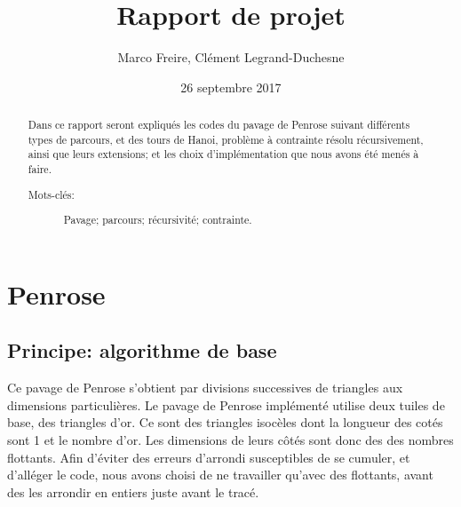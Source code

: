 \documentclass[a4paper, 11pt]{article}%
\begin{document}
\title{Rapport de projet}

\author{Marco Freire, Clément Legrand-Duchesne}

\date{26 septembre 2017}

\maketitle

\begin{abstract}
  Dans ce rapport seront expliqués les codes du pavage de Penrose
  suivant différents types de parcours, et des tours de Hanoi, problème
  à contrainte résolu récursivement, ainsi que leurs extensions; et les
  choix d'implémentation que nous avons été menés à faire.
  \begin{description}
    
  \item[Mots-clés:] Pavage; parcours; récursivité; contrainte.

   

  \end{description}
\end{abstract}


\section{Penrose}
        \subsection{Principe: algorithme de base}
                Ce pavage de Penrose s'obtient par divisions
                successives de triangles aux dimensions particulières. 
                Le pavage de Penrose implémenté utilise deux tuiles de
                base, des triangles d'or. Ce sont des triangles
                isocèles dont la longueur des cotés sont 1 et le
                nombre d'or. 
                Les dimensions de leurs
                côtés sont donc des des nombres flottants. Afin
                d'éviter des erreurs d'arrondi susceptibles de se
                cumuler, et d'alléger le code, nous avons choisi de ne
                travailler qu'avec des flottants, avant des les
                arrondir en entiers juste avant le tracé.
                
\end{document}
